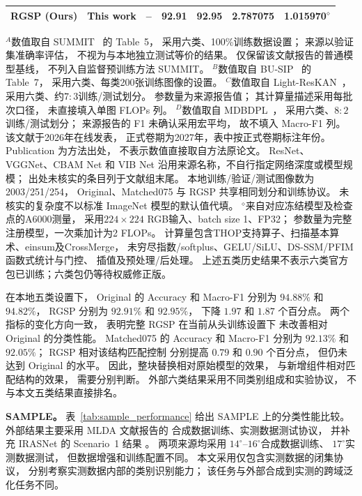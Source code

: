 \begin{table}[!t]
\begin{tabular*}{\textwidth}{@{\extracolsep{\fill}}lccrrrr}
RGSP (Ours)
& This work & --
& 92.91 & 92.95 & 2.787075 & 1.015970$^{\diamond}$ \\
\bottomrule
\end{tabular*}
\smallskip
\begin{minipage}{\linewidth}
\footnotesize
$^{A}$数值取自 SUMMIT~\cite{summit2025} 的 Table~5，
采用六类、100\%训练数据设置；
来源以验证集准确率评估，
不视为与本地独立测试等价的结果。
仅保留该文献报告的普通模型基线，
不列入自监督预训练方法 SUMMIT。
$^{B}$数值取自 BU-SIP~\cite{busip2025} 的 Table~7，
采用六类、每类200张训练图像的设置。
$^{C}$数值取自 Light-ResKAN~\cite{lightreskan2026}，
采用六类、约$7:3$训练/测试划分。
参数量为来源报告值；
其计算量描述采用每批次口径，
未直接填入单图 FLOPs 列。
$^{D}$数值取自 MDBDPL~\cite{mdbdpl2027}，
采用六类、$8:2$训练/测试划分；
来源报告的 F1 未确认采用宏平均，
故不填入 Macro-F1 列。
该文献于2026年在线发表，
正式卷期为2027年，表中按正式卷期标注年份。
Publication 为方法出处，
不表示数值直接取自方法原论文。
ResNet、VGGNet、CBAM Net 和 VIB Net
沿用来源名称，不自行指定网络深度或模型规模；
出处未核实的条目列于文献组末尾。
本地训练/验证/测试图像数为2003/251/254，
Original、Matched075 与 RGSP
共享相同划分和训练协议。
未核实的复杂度不以标准 ImageNet 模型的默认值代填。
$^{\diamond}$来自对应冻结模型及检查点的A6000测量，
采用$224\times224$ RGB输入、batch size 1、FP32；
参数量为完整注册模型，一次乘加计为2 FLOPs。
计算量包含THOP支持算子、扫描基本算术、einsum及CrossMerge，
未穷尽指数/softplus、GELU/SiLU、DS-SSM/PFIM函数式统计与门控、
插值及预处理/后处理。
上述五类历史结果不表示六类官方包已训练；六类包仍等待权威修正版。
\end{minipage}
\end{table}

在本地五类设置下，
Original 的 Accuracy 和 Macro-F1
分别为 $94.88\%$ 和 $94.82\%$，
RGSP 分别为 $92.91\%$ 和 $92.95\%$，
下降 $1.97$ 和 $1.87$ 个百分点。
两个指标的变化方向一致，
表明完整 RGSP 在当前从头训练设置下
未改善相对 Original 的分类性能。
Matched075 的 Accuracy 和 Macro-F1
分别为 $92.13\%$ 和 $92.05\%$；
RGSP 相对该结构匹配控制
分别提高 $0.79$ 和 $0.90$ 个百分点，
但仍未达到 Original 的水平。
因此，整块替换相对原始模型的效果，
与新增组件相对匹配结构的效果，
需要分别判断。
外部六类结果采用不同类别组成和实验协议，
不与本文五类结果直接排名。

\textbf{SAMPLE。}
表~\ref{tab:sample_performance}
给出 SAMPLE 上的分类性能比较。
外部结果主要采用 MLDA 文献报告的
合成数据训练、实测数据测试协议，
并补充 IRASNet 的 Scenario~1 结果
\cite{mlda2025,irasnet2025}。
两项来源均采用
$14^\circ$--$16^\circ$合成数据训练、
$17^\circ$实测数据测试，
但数据增强和训练配置不同。
本文采用仅包含实测数据的闭集协议，
分别考察实测数据内部的类别识别能力；
该任务与外部合成到实测的跨域泛化任务不同。

